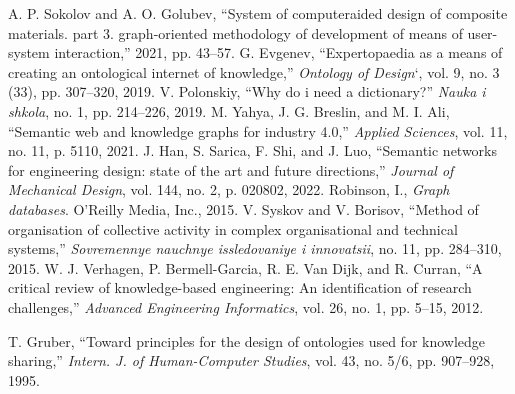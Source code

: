 \documentclass[a4paper]{article}
\begin{document}
\begin{multicols}{2}
\begin{center}
\begin{thebibliography}{46}
    A. P. Sokolov and A. O. Golubev, “System of computeraided design of composite materials. part 3. graph-oriented
methodology of development of means of user-system
interaction,” 2021, pp. 43–57.
     G. Evgenev, “Expertopaedia as a means of creating an ontological
internet of knowledge,” \textit{Ontology of Design}`, vol. 9, no. 3 (33), pp.
307–320, 2019.
     V. Polonskiy, “Why do i need a dictionary?” \textit{Nauka i shkola}, no. 1,
pp. 214–226, 2019.
    M. Yahya, J. G. Breslin, and M. I. Ali, “Semantic web and
knowledge graphs for industry 4.0,” \textit{Applied Sciences}, vol. 11,
no. 11, p. 5110, 2021.
    J. Han, S. Sarica, F. Shi, and J. Luo, “Semantic networks for
engineering design: state of the art and future directions,” \textit{Journal
of Mechanical Design}, vol. 144, no. 2, p. 020802, 2022.
     Robinson, I., \textit{Graph databases}. O’Reilly Media, Inc., 2015.
     V. Syskov and V. Borisov, “Method of organisation of collective
activity in complex organisational and technical systems,” \textit{Sovremennye nauchnye issledovaniye i innovatsii}, no. 11, pp. 284–310,
2015.
     W. J. Verhagen, P. Bermell-Garcia, R. E. Van Dijk, and R. Curran,
“A critical review of knowledge-based engineering: An identification of research challenges,” \textit{Advanced Engineering Informatics},
vol. 26, no. 1, pp. 5–15, 2012.

    T. Gruber, “Toward principles for the design of ontologies used
for knowledge sharing,” \textit{Intern. J. of Human-Computer Studies},
vol. 43, no. 5/6, pp. 907–928, 1995.


\end{thebibliography}
\end{center}
\end{multicols}
\end{document}
